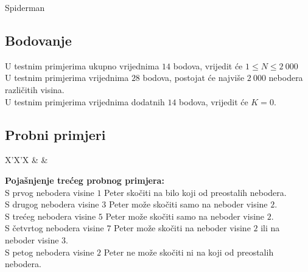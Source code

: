 \begin{statement}[
  problempoints=70,
  timelimit=1 sekunda,
  memorylimit=512 MiB,
]{Spiderman}
\subsection*{Bodovanje}
U testnim primjerima ukupno vrijednima $14$ bodova, vrijedit će $1 \le N \le 2\ 000$\\
U testnim primjerima vrijednima $28$ bodova, postojat će najviše $2\ 000$
nebodera različitih visina.\\
U testnim primjerima vrijednima dodatnih $14$ bodova, vrijedit će $K = 0$.

\subsection*{Probni primjeri}
\begin{tabularx}{\textwidth}{X'X'X}
 &
 &
\end{tabularx}

\textbf{Pojašnjenje trećeg probnog primjera:}\\
S prvog nebodera visine $1$ Peter skočiti na bilo koji od preostalih nebodera.\\
S drugog nebodera visine $3$ Peter može skočiti samo na neboder visine $2$.\\
S trećeg nebodera visine $5$ Peter može skočiti samo na neboder visine $2$.\\
S četvrtog nebodera visine $7$ Peter može skočiti na neboder visine $2$ ili na neboder visine $3$.\\
S petog nebodera visine $2$ Peter ne može skočiti ni na koji od preostalih nebodera.

\end{statement}

